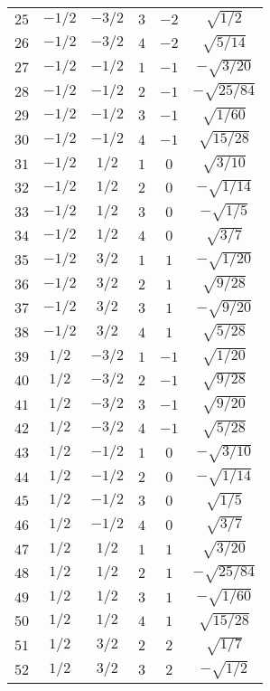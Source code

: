\begin{table}
\begin{center}
\begin{tabular}{|c|c|c|c|c|c|}
$25$ & $-1/2$ & $-3/2$ & $3$ & $-2$ & $\sqrt{1/2}$ \\ 
$26$ & $-1/2$ & $-3/2$ & $4$ & $-2$ & $\sqrt{5/14}$ \\ 
$27$ & $-1/2$ & $-1/2$ & $1$ & $-1$ & $-\sqrt{3/20}$ \\ 
$28$ & $-1/2$ & $-1/2$ & $2$ & $-1$ & $-\sqrt{25/84}$ \\ 
$29$ & $-1/2$ & $-1/2$ & $3$ & $-1$ & $\sqrt{1/60}$ \\ 
$30$ & $-1/2$ & $-1/2$ & $4$ & $-1$ & $\sqrt{15/28}$ \\ 
$31$ & $-1/2$ & $1/2$ & $1$ & $0$ & $\sqrt{3/10}$ \\ 
$32$ & $-1/2$ & $1/2$ & $2$ & $0$ & $-\sqrt{1/14}$ \\ 
$33$ & $-1/2$ & $1/2$ & $3$ & $0$ & $-\sqrt{1/5}$ \\ 
$34$ & $-1/2$ & $1/2$ & $4$ & $0$ & $\sqrt{3/7}$ \\ 
$35$ & $-1/2$ & $3/2$ & $1$ & $1$ & $-\sqrt{1/20}$ \\ 
$36$ & $-1/2$ & $3/2$ & $2$ & $1$ & $\sqrt{9/28}$ \\ 
$37$ & $-1/2$ & $3/2$ & $3$ & $1$ & $-\sqrt{9/20}$ \\ 
$38$ & $-1/2$ & $3/2$ & $4$ & $1$ & $\sqrt{5/28}$ \\ 
$39$ & $1/2$ & $-3/2$ & $1$ & $-1$ & $\sqrt{1/20}$ \\ 
$40$ & $1/2$ & $-3/2$ & $2$ & $-1$ & $\sqrt{9/28}$ \\ 
$41$ & $1/2$ & $-3/2$ & $3$ & $-1$ & $\sqrt{9/20}$ \\ 
$42$ & $1/2$ & $-3/2$ & $4$ & $-1$ & $\sqrt{5/28}$ \\ 
$43$ & $1/2$ & $-1/2$ & $1$ & $0$ & $-\sqrt{3/10}$ \\ 
$44$ & $1/2$ & $-1/2$ & $2$ & $0$ & $-\sqrt{1/14}$ \\ 
$45$ & $1/2$ & $-1/2$ & $3$ & $0$ & $\sqrt{1/5}$ \\ 
$46$ & $1/2$ & $-1/2$ & $4$ & $0$ & $\sqrt{3/7}$ \\ 
$47$ & $1/2$ & $1/2$ & $1$ & $1$ & $\sqrt{3/20}$ \\ 
$48$ & $1/2$ & $1/2$ & $2$ & $1$ & $-\sqrt{25/84}$ \\ 
$49$ & $1/2$ & $1/2$ & $3$ & $1$ & $-\sqrt{1/60}$ \\ 
$50$ & $1/2$ & $1/2$ & $4$ & $1$ & $\sqrt{15/28}$ \\ 
$51$ & $1/2$ & $3/2$ & $2$ & $2$ & $\sqrt{1/7}$ \\ 
$52$ & $1/2$ & $3/2$ & $3$ & $2$ & $-\sqrt{1/2}$ \\ 

\end{tabular}
\end{center}
\end{table}
